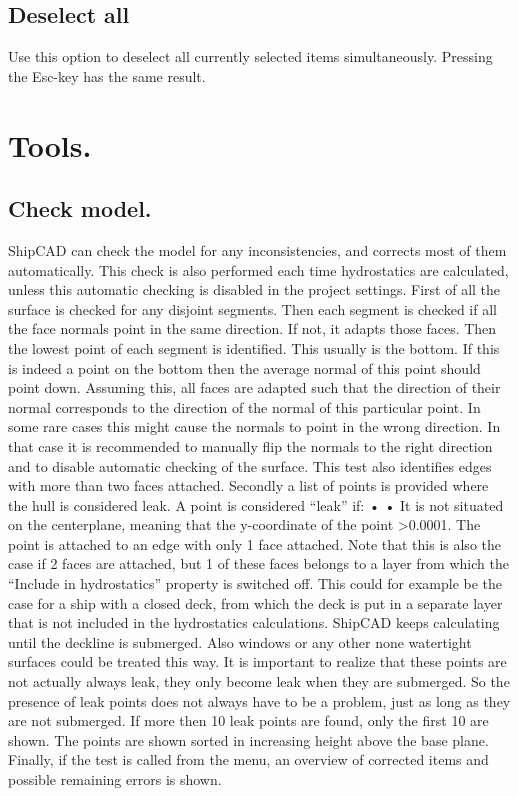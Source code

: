 \documentclass[12pt]{article}
\begin{document}
\subsection{Deselect all}
Use this option to deselect all currently selected items simultaneously. Pressing the Esc-key has
the same result.

\section{Tools.}

\subsection{Check model.}
ShipCAD can check the model for any inconsistencies, and corrects most of them automatically.
This check is also performed each time hydrostatics are calculated, unless this automatic checking
is disabled in the project settings. First of all the surface is checked for any disjoint segments. Then
each segment is checked if all the face normals point in the same direction. If not, it adapts those
faces. Then the lowest point of each segment is identified. This usually is the bottom. If this is
indeed a point on the bottom then the average normal of this point should point down. Assuming
this, all faces are adapted such that the direction of their normal corresponds to the direction of the
normal of this particular point. In some rare cases this might cause the normals to point in the wrong
direction. In that case it is recommended to manually flip the normals to the right direction and to
disable automatic checking of the surface. This test also identifies edges with more than two faces
attached. Secondly a list of points is provided where the hull is considered leak. A point is
considered “leak” if:
•
•
It is not situated on the centerplane, meaning that the y-coordinate of the point >0.0001.
The point is attached to an edge with only 1 face attached. Note that this is also the case if
2 faces are attached, but 1 of these faces belongs to a layer from which the “Include in
hydrostatics” property is switched off. This could for example be the case for a ship with a
closed deck, from which the deck is put in a separate layer that is not included in the
hydrostatics calculations. ShipCAD keeps calculating until the deckline is submerged.
Also windows or any other none watertight surfaces could be treated this way.
It is important to realize that these points are not actually always leak, they only become leak when
they are submerged. So the presence of leak points does not always have to be a problem, just as
long as they are not submerged. If more then 10 leak points are found, only the first 10 are shown.
The points are shown sorted in increasing height above the base plane.
Finally, if the test is called from the menu, an overview of corrected items and possible remaining
errors is shown.
\end{document}
